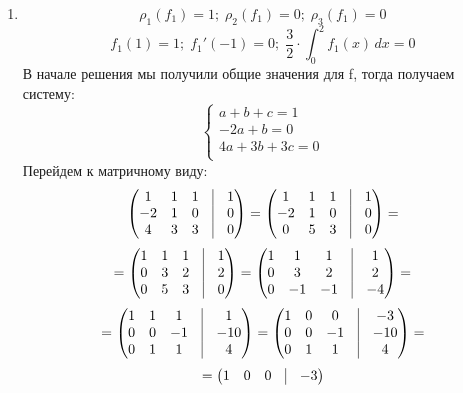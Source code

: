 \documentclass[a4paper,12pt]{article}
\begin{document}
\begin{enumerate}
\item
\[
\rho_1(f_1) = 1; \; \rho_2(f_1) = 0; \; \rho_3(f_1) = 0
\]
\[
f_1(1)  = 1; \; f_1'(-1) = 0; \; \frac{3}{2} \cdot \int_{0}^{2} f_1(x) \, dx = 0
\]
В начале решения мы получили общие значения для f, тогда получаем систему:
\[
\begin{cases}
a + b + c = 1 \\
-2a + b = 0 \\
4a +3b + 3c = 0 \\
\end{cases}
\]
Перейдем к матричному виду:
\[
\begin{pmatrix}
1 & 1 & 1 & \vrule &1  \\
-2 & 1 & 0 & \vrule &0 \\
4 & 3 & 3 & \vrule &0  \\
\end{pmatrix}
=
\begin{pmatrix}
1 & 1 & 1 & \vrule &1 \\
-2 & 1 & 0 & \vrule &0 \\
0 & 5 & 3 & \vrule &0  \\
\end{pmatrix}
=
\]
\[
=
\begin{pmatrix}
1 & 1 & 1 & \vrule &1 \\
0 & 3 & 2 & \vrule &2 \\
0 & 5 & 3 & \vrule &0  \\
\end{pmatrix}
=
\begin{pmatrix}
1 & 1 & 1 & \vrule &1 \\
0 & 3 & 2 & \vrule &2  \\
0 & -1 & -1 & \vrule &-4  \\
\end{pmatrix}
=
\]
\[
=
\begin{pmatrix}
1 & 1 & 1 & \vrule &1 \\
0 & 0 & -1 & \vrule &-10 \\
0 & 1 & 1 & \vrule &4  \\
\end{pmatrix}
=
\begin{pmatrix}
1 & 0 & 0 & \vrule &-3  \\
0 & 0 & -1 & \vrule &-10 \\
0 & 1 & 1 & \vrule &4\\
\end{pmatrix}
=
\]
\[
=
\begin{pmatrix}
1 & 0 & 0 & \vrule &-3 \\

\end{pmatrix}\]
\end{enumerate}
\end{document}
